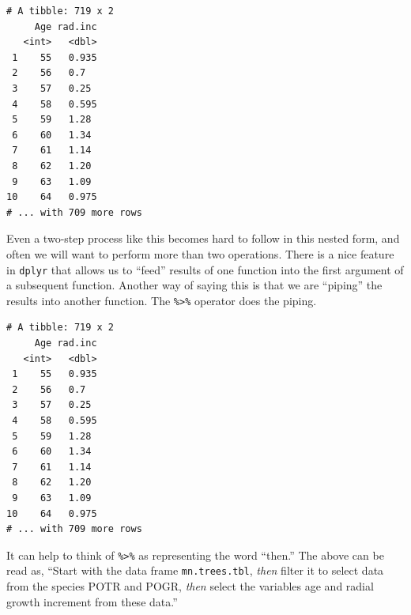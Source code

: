 \documentclass[]{krantz}
\makeatletter
\newenvironment{Shaded}{\begin{snugshade}}{\end{snugshade}}
\newcommand{\KeywordTok}[1]{\textcolor[rgb]{0.27,0.27,0.27}{\textbf{#1}}}
\newcommand{\StringTok}[1]{\textcolor[rgb]{0.5,0.5,0.5}{#1}}
\newcommand{\OperatorTok}[1]{\textcolor[rgb]{0.43,0.43,0.43}{\textbf{#1}}}
\newcommand{\NormalTok}[1]{#1}
\newenvironment{kframe}{%
\medskip{}
\setlength{\fboxsep}{.8em}
 \def\at@end@of@kframe{}%
 \ifinner\ifhmode%
  \def\at@end@of@kframe{\end{minipage}}%
  \begin{minipage}{\columnwidth}%
 \fi\fi%
 \def\FrameCommand##1{\hskip\@totalleftmargin \hskip-\fboxsep
 \colorbox{shadecolor}{##1}\hskip-\fboxsep
     \hskip-\linewidth \hskip-\@totalleftmargin \hskip\columnwidth}%
 \MakeFramed {\advance\hsize-\width
   \@totalleftmargin\z@ \linewidth\hsize
   \@setminipage}}%
 {\par\unskip\endMakeFramed%
 \at@end@of@kframe}
\renewenvironment{Shaded}{\begin{kframe}}{\end{kframe}}
\theoremstyle{definition}
\theoremstyle{definition}
\theoremstyle{definition}
\theoremstyle{remark}
\makeatother
\begin{document}
\begin{Shaded}
\end{Shaded}

\begin{verbatim}
# A tibble: 719 x 2
     Age rad.inc
   <int>   <dbl>
 1    55   0.935
 2    56   0.7  
 3    57   0.25 
 4    58   0.595
 5    59   1.28 
 6    60   1.34 
 7    61   1.14 
 8    62   1.20 
 9    63   1.09 
10    64   0.975
# ... with 709 more rows
\end{verbatim}

Even a two-step process like this becomes hard to follow in this nested
form, and often we will want to perform more than two operations. There
is a nice feature in \texttt{dplyr} that allows us to ``feed'' results
of one function into the first argument of a subsequent function.
Another way of saying this is that we are ``piping'' the results into
another function. The \texttt{\%\textgreater{}\%} operator does the
piping.

\begin{Shaded}
\end{Shaded}

\begin{verbatim}
# A tibble: 719 x 2
     Age rad.inc
   <int>   <dbl>
 1    55   0.935
 2    56   0.7  
 3    57   0.25 
 4    58   0.595
 5    59   1.28 
 6    60   1.34 
 7    61   1.14 
 8    62   1.20 
 9    63   1.09 
10    64   0.975
# ... with 709 more rows
\end{verbatim}

It can help to think of \texttt{\%\textgreater{}\%} as representing the
word ``then.'' The above can be read as, ``Start with the data frame
\texttt{mn.trees.tbl}, \emph{then} filter it to select data from the
species POTR and POGR, \emph{then} select the variables age and radial
growth increment from these data.''
\end{document}
